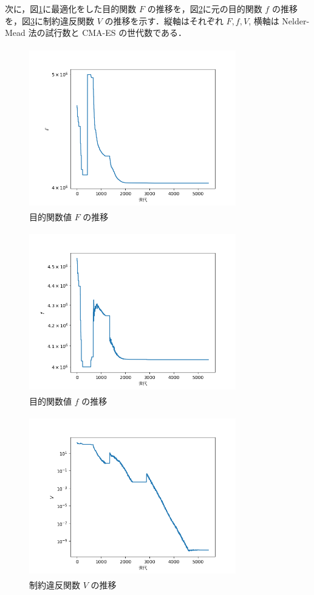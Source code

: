 \documentclass[twocolumn]{jarticle}
\begin{document}
次に，図\ref{img_F}に最適化をした目的関数 $F$ の推移を，図\ref{img_f}に元の目的関数 $f$ の推移を，図\ref{img_V}に制約違反関数 $V$ の推移を示す．縦軸はそれぞれ $F, f, V$, 横軸は Nelder-Mead 法の試行数と CMA-ES の世代数である．
\begin{figure}
    \centering
    \includegraphics[width=9cm, height=7cm]{img_F.png}
    \caption{目的関数値 $F$ の推移}
    \label{img_F}
\end{figure}
\begin{figure}
    \centering
    \includegraphics[width=9cm, height=7cm]{img_f.png}
    \caption{目的関数値 $f$ の推移}
    \label{img_f}
\end{figure}
\begin{figure}
    \centering
    \includegraphics[width=9cm, height=7cm]{img_V.png}
    \caption{制約違反関数 $V$ の推移} 
    \label{img_V}
\end{figure}
\end{document}
